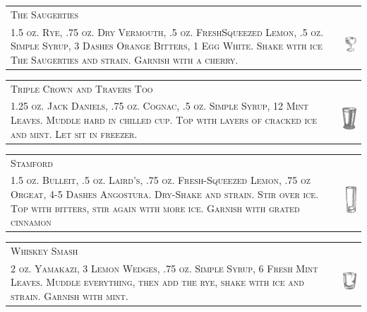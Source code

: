\documentclass{article}
\begin{document}
\begin{tabular}{b{2.5in} m{0.625in}}
  \multicolumn{2}{p{3.5in}}{\centering\Huge\textsc{The Saugerties}} \\ 
  
  \textsc{1.5 oz. Rye, .75 oz. Dry Vermouth, .5 oz. FreshSqueezed
    Lemon, .5 oz. Simple Syrup, 3 Dashes Orange Bitters, 1 Egg
    White. Shake with ice The Saugerties and strain. Garnish with a
    cherry.} & \includegraphics[width=0.5in]{coupe.png}
\end{tabular}

\begin{tabular}{b{2.5in} m{0.625in}}
  \multicolumn{2}{p{3.5in}}{\centering\Huge\textsc{Triple Crown and Travers Too}} \\ 
  
  \textsc{1.25 oz. Jack Daniels, .75 oz. Cognac, .5 oz. Simple Syrup,
    12 Mint Leaves. Muddle hard in chilled cup. Top with layers of
    cracked ice and mint. Let sit in freezer.} &
  \includegraphics[width=0.5in]{julep.png}
\end{tabular}

\begin{tabular}{b{2.5in} m{0.625in}}
  \multicolumn{2}{p{3.5in}}{\centering\Huge\textsc{Stamford}} \\ 
  
  \textsc{1.5 oz. Bulleit, .5 oz. Laird's, .75 oz.  Fresh-Squeezed
    Lemon, .75 oz Orgeat, 4-5 Dashes Angostura. Dry-Shake and
    strain. Stir over ice. Top with bitters, stir again with more
    ice. Garnish with grated cinnamon} &
  \includegraphics[width=0.5in]{collins.png}
\end{tabular}

\begin{tabular}{b{2.5in} m{0.625in}}
  \multicolumn{2}{p{3.5in}}{\centering\Huge\textsc{Whiskey Smash}} \\ 
  
  \textsc{2 oz. Yamakazi, 3 Lemon Wedges, .75 oz.  Simple Syrup, 6
    Fresh Mint Leaves. Muddle everything, then add the rye, shake with
    ice and strain. Garnish with mint.} &
  \includegraphics[width=0.5in]{rocks_glass.png}
\end{tabular}
\end{document}
